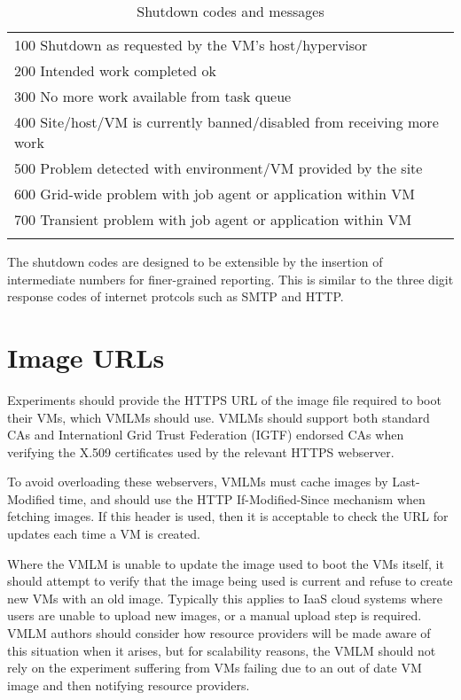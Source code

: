 \documentclass[12pt,a4paper]{article}
\begin{document}
\begin{center}
\begin{table}[h]
\label{table:shutdowncodes}
\begin{center}
\begin{tabular}{l}
\\
100 Shutdown as requested by the VM's host/hypervisor \\
200 Intended work completed ok \\
300 No more work available from task queue \\
400 Site/host/VM is currently banned/disabled from receiving more work \\
500 Problem detected with environment/VM provided by the site \\
600 Grid-wide problem with job agent or application within VM \\
700 Transient problem with job agent or application within VM \\
\\
\end{tabular}
\caption{\label{opt}Shutdown codes and messages}
\end{center}
\end{table}
\end{center}

The shutdown codes are designed to be extensible by the insertion of 
intermediate numbers for finer-grained reporting. This is similar to the
three digit response codes of internet protcols such as SMTP and HTTP.

\section{Image URLs}
\label{sec:imageurls}

Experiments should provide the HTTPS URL of the image file required to boot
their VMs, which VMLMs should use. VMLMs should support both standard CAs
and Internationl Grid Trust Federation (IGTF) endorsed CAs when verifying
the X.509 certificates used by the relevant HTTPS webserver.

To avoid overloading these webservers, VMLMs must cache images by 
Last-Modified time, and should use the HTTP If-Modified-Since mechanism
when fetching images. If this header is used, then it is acceptable to
check the URL for updates each time a VM is created.

Where the VMLM is unable to update the image used to boot the VMs itself, 
it should attempt to verify that the image being used is current and refuse
to create new VMs with an old image. Typically this applies to IaaS cloud
systems where users are unable to upload new images, or a manual upload step
is required. VMLM authors should consider how resource providers will be
made aware of this situation when it arises, but for scalability reasons,
the VMLM should not rely on the experiment suffering from VMs failing 
due to an out of date VM image and then notifying resource providers.
\end{document}
